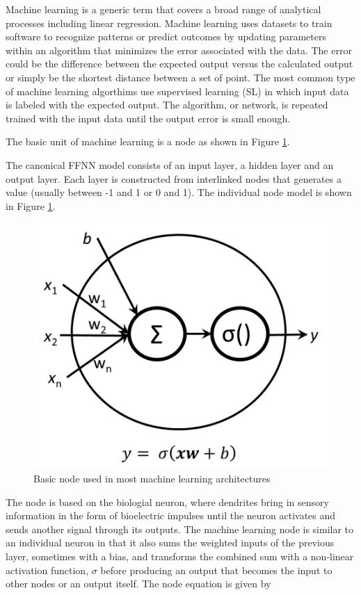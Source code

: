 \documentclass[10pt,a4paper,twocolumn]{article}
\begin{document}
Machine learning is a generic term that covers a broad range of analytical processes including linear regression. Machine learning uses datasets to train software to recognize patterns or predict outcomes by updating parameters within an algorithm that minimizes the error associated with the data. The error could be the difference between the expected output versus the calculated output or simply be the shortest distance between a set of point. The most common type of machine learning algorthims use supervised learning (SL) in which input data is labeled with the expected output. The algorithm, or network, is repeated trained with the input data until the output error is small enough.

The basic unit of machine learning is a node as shown in  Figure \ref{fig:node}.

The canonical FFNN model consists of an input layer, a hidden layer and an output layer. Each layer is constructed from interlinked nodes that generates a value (usually between -1 and 1 or 0 and 1). The individual node model is shown in Figure \ref{fig:node}. \\

\begin{figure}[]
\centering
\includegraphics[width=\columnwidth]{images/node.png}  %
\caption{Basic node used in most machine learning architectures }
\label{fig:node}
\end{figure}
%
The node is based on the biologial neuron, where dendrites bring in sensory information in the form of bioelectric impulses until the neuron activates and sends another signal through its outputs. The machine learning node is similar to an individual neuron in that it also sums the weighted inputs of the previous layer, sometimes with a bias, and transforms the combined sum with a non-linear activation function, $\sigma$ before producing an output that becomes the input to other nodes or an output itself. The node  equation is given by
\end{document}
